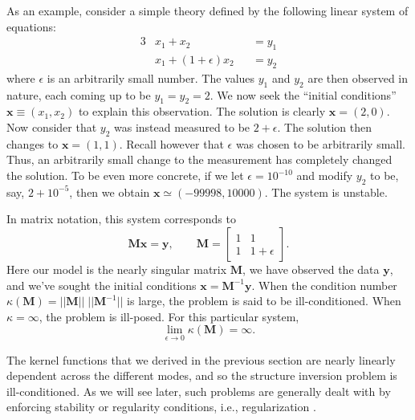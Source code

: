 As an example, consider a simple theory defined by the following linear system of equations:
\begin{alignat}{3}
    &x_1 + x_2& &= y_1 \\
    &x_1 + (1+\epsilon)x_2& &= y_2
\end{alignat}
where $\epsilon$ is an arbitrarily small number. %
The values $y_1$ and $y_2$ are then observed in nature, each coming up to be ${y_1=y_2=2}$. 
We now seek the ``initial conditions'' ${\mathbf{x} \equiv (x_1,x_2)}$ to explain this observation. 
The solution is clearly ${\mathbf{x}=(2,0)}$. 
Now consider that $y_2$ was instead measured to be ${2+\epsilon}$. 
The solution then changes to ${\mathbf{x}=(1,1)}$. 
Recall however that $\epsilon$ was chosen to be arbitrarily small. 
Thus, an arbitrarily small change to the measurement has completely changed the solution. 
To be even more concrete, if we let ${\epsilon=10^{-10}}$ and modify $y_2$ to be, say, ${2+10^{-5}}$, then we obtain ${\mathbf{x}\simeq(-99998, 10000)}$. 
The system is unstable. 

In matrix notation, this system corresponds to
\begin{equation}
    \mathbf{M}\mathbf{x}
    =
    \mathbf{y},
    \qquad
    \mathbf{M}
    =
    \begin{bmatrix}
        1 & 1 \\
        1 & 1+\epsilon 
    \end{bmatrix}. \iffalse,
    \qquad
    \mathbf{y}
    =
    \begin{bmatrix}
        2\\2
    \end{bmatrix}.
    \fi
\end{equation}
Here our model is the nearly singular matrix $\mathbf{M}$, we have observed the data $\mathbf{y}$, and we've sought the initial conditions ${\mathbf{x}=\mathbf{M}^{-1}\mathbf{y}}$. 
When the condition number ${\kappa(\mathbf{M})=||\mathbf{M}||\;||\mathbf{M}^{-1}||}$ is large, the problem is said to be ill-conditioned. 
When ${\kappa = \infty}$, the problem is ill-posed. 
For this particular system, 
\begin{equation}
    \lim_{\epsilon\to 0} \kappa(\mathbf{M}) = \infty.
\end{equation}

The kernel functions that we derived in the previous section are nearly linearly dependent across the different modes, and so the structure inversion problem is ill-conditioned. 
As we will see later, such problems are generally dealt with by enforcing stability or regularity conditions, i.e., regularization \citep[e.g.,][]{tikhonov1977solutions, tenorio2001statistical}. 



